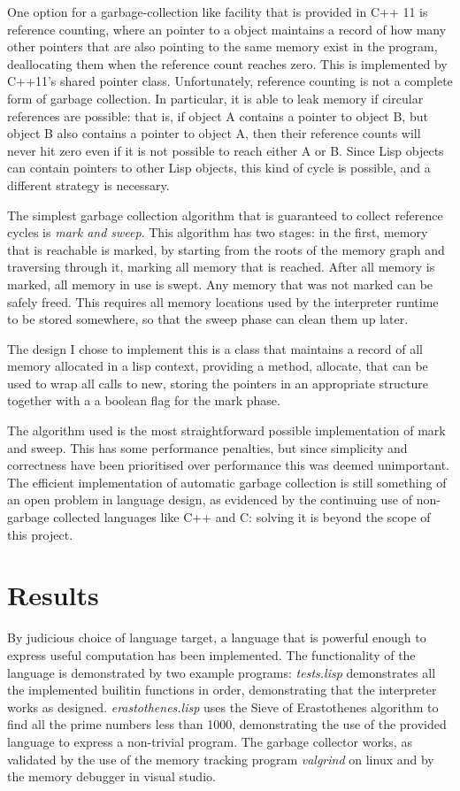 \documentclass[12pt]{article}
\begin{document}
One option for a garbage-collection like facility that is provided in C++ 11 is reference counting, where an pointer to a object maintains a record of how many
other pointers that are also pointing to the same memory exist in the program, deallocating them when the reference count reaches zero. This is implemented by C++11's
shared pointer class.
Unfortunately, reference counting is not a complete form of garbage collection. In particular, it is able to leak memory if circular references are possible: that is,
if object A contains a pointer to object B, but object B also contains a pointer to object A, then their reference counts will never hit zero even if it is not possible
to reach either A or B. Since Lisp objects can contain pointers to other Lisp objects, this kind of cycle is possible, and a different strategy is necessary.

The simplest garbage collection algorithm that is guaranteed to collect reference cycles is \textit{mark and sweep}. This algorithm has two stages: in the first,
memory that is reachable is marked, by starting from the roots of the memory graph and traversing through it, marking all memory that is reached. After all memory is
marked, all memory in use is swept. Any memory that was not marked can be safely freed. This requires all memory locations used by the interpreter runtime to be
stored somewhere, so that the sweep phase can clean them up later.

The design I chose to implement this is a class that maintains a record of all memory allocated in a lisp context, providing a method, allocate, that can be used to wrap
all calls to new, storing the pointers in an appropriate structure together with a a boolean flag for the mark phase.

The algorithm used is the most straightforward possible implementation of
mark and sweep. This has some performance penalties, but since simplicity and
correctness have been prioritised over performance this was deemed
unimportant. The efficient implementation of automatic garbage collection is
still something of an open problem in language design, as evidenced by the
continuing use of non-garbage collected languages like C++ and C: solving
it is beyond the scope of this project.

\section{Results}

By judicious choice of language target, a language that is powerful enough to
express useful computation has been implemented. The functionality of the
language is demonstrated by two example programs: \textit{tests.lisp} demonstrates all the implemented builitin functions in order, demonstrating that
the interpreter works as designed. \textit{erastothenes.lisp} uses the Sieve of
Erastothenes algorithm to find all the prime numbers less than 1000, demonstrating the use of the provided language to express a non-trivial program.
The garbage collector works, as validated by the use of the memory tracking program \textit{valgrind} on linux and by the memory debugger in visual studio. %
\end{document}
